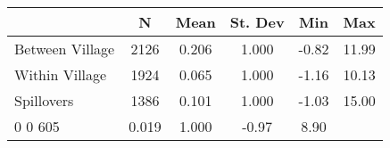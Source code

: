 \begin{tabular}{l*{5}{c}}\hline&\multicolumn{1}{c}{N}&\multicolumn{1}{c}{Mean}&\multicolumn{1}{c}{St. Dev}&\multicolumn{1}{c}{Min}&\multicolumn{1}{c}{Max}\\ \hline 
Between Village & 2126 & 0.206 & 1.000 & -0.82 & 11.99 \\
Within Village & 1924 & 0.065 & 1.000 & -1.16 & 10.13 \\
Spillovers & 1386 & 0.101 & 1.000 & -1.03 & 15.00 \\
0 0 605 & 0.019 & 1.000 & -0.97 & 8.90 \\
\hline \end{tabular}
